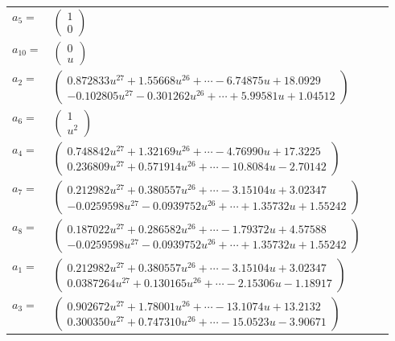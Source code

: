 \documentclass[1p]{elsarticle_modified}
\theoremstyle{definition}
\begin{document}
\begin{tabular}{m{7pt} m{180pt} m{7pt} m{180pt} }
\flushright $a_{5}=$&$\begin{pmatrix}1\\0\end{pmatrix}$ \\
\flushright $a_{10}=$&$\begin{pmatrix}0\\u\end{pmatrix}$ \\
\flushright $a_{2}=$&$\begin{pmatrix}0.872833 u^{27}+1.55668 u^{26}+\cdots-6.74875 u+18.0929\\-0.102805 u^{27}-0.301262 u^{26}+\cdots+5.99581 u+1.04512\end{pmatrix}$ \\
\flushright $a_{6}=$&$\begin{pmatrix}1\\u^2\end{pmatrix}$ \\
\flushright $a_{4}=$&$\begin{pmatrix}0.748842 u^{27}+1.32169 u^{26}+\cdots-4.76990 u+17.3225\\0.236809 u^{27}+0.571914 u^{26}+\cdots-10.8084 u-2.70142\end{pmatrix}$ \\
\flushright $a_{7}=$&$\begin{pmatrix}0.212982 u^{27}+0.380557 u^{26}+\cdots-3.15104 u+3.02347\\-0.0259598 u^{27}-0.0939752 u^{26}+\cdots+1.35732 u+1.55242\end{pmatrix}$ \\
\flushright $a_{8}=$&$\begin{pmatrix}0.187022 u^{27}+0.286582 u^{26}+\cdots-1.79372 u+4.57588\\-0.0259598 u^{27}-0.0939752 u^{26}+\cdots+1.35732 u+1.55242\end{pmatrix}$ \\
\flushright $a_{1}=$&$\begin{pmatrix}0.212982 u^{27}+0.380557 u^{26}+\cdots-3.15104 u+3.02347\\0.0387264 u^{27}+0.130165 u^{26}+\cdots-2.15306 u-1.18917\end{pmatrix}$ \\
\flushright $a_{3}=$&$\begin{pmatrix}0.902672 u^{27}+1.78001 u^{26}+\cdots-13.1074 u+13.2132\\0.300350 u^{27}+0.747310 u^{26}+\cdots-15.0523 u-3.90671\end{pmatrix}$ \\

\end{tabular}
\end{document}

